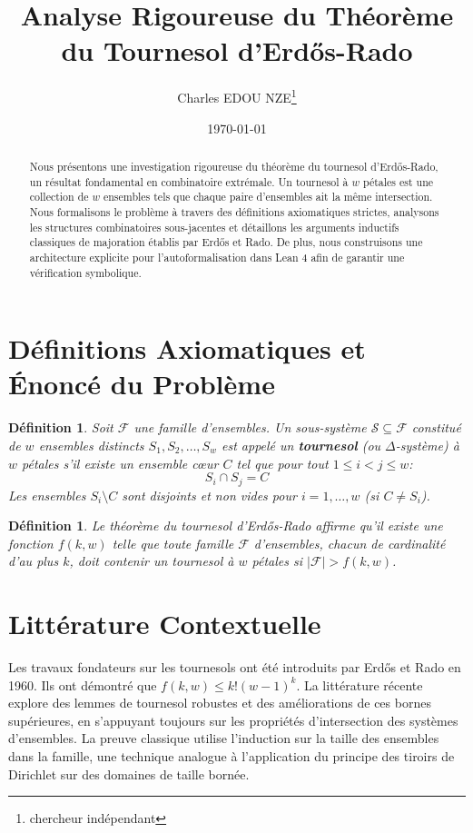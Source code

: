 \documentclass[12pt,a4paper]{article}
\title{Analyse Rigoureuse du Th\'eor\`eme du Tournesol d'Erd\H{o}s-Rado}
\author{Charles EDOU NZE\thanks{chercheur ind\'ependant}}
\date{\today}
\newtheorem{definition}[theorem]{D\'efinition}
\begin{document}
\maketitle
\thispagestyle{fancy}
\fancyhf{}
\renewcommand{\headrulewidth}{0pt}

\begin{abstract}
Nous pr\'esentons une investigation rigoureuse du th\'eor\`eme du tournesol d'Erd\H{o}s-Rado, un r\'esultat fondamental en combinatoire extr\'emale. Un tournesol \`a $w$ p\'etales est une collection de $w$ ensembles tels que chaque paire d'ensembles ait la m\^eme intersection. Nous formalisons le probl\`eme \`a travers des d\'efinitions axiomatiques strictes, analysons les structures combinatoires sous-jacentes et d\'etaillons les arguments inductifs classiques de majoration \'etablis par Erd\H{o}s et Rado. De plus, nous construisons une architecture explicite pour l'autoformalisation dans Lean 4 afin de garantir une v\'erification symbolique.
\end{abstract}

\section{D\'efinitions Axiomatiques et \'Enonc\'e du Probl\`eme}
\begin{definition}
Soit $\mathcal{F}$ une famille d'ensembles. Un sous-syst\`eme $\mathcal{S} \subseteq \mathcal{F}$ constitu\'e de $w$ ensembles distincts $S_1, S_2, \dots, S_w$ est appel\'e un \textbf{tournesol} (ou $\Delta$-syst\`eme) \`a $w$ p\'etales s'il existe un ensemble c{\oe}ur $C$ tel que pour tout $1 \le i < j \le w$:
\begin{equation}
S_i \cap S_j = C \label{eq:sunflower}
\end{equation}
Les ensembles $S_i \setminus C$ sont disjoints et non vides pour $i = 1, \dots, w$ (si $C \neq S_i$).
\end{definition}
\begin{definition}
Le th\'eor\`eme du tournesol d'Erd\H{o}s-Rado affirme qu'il existe une fonction $f(k, w)$ telle que toute famille $\mathcal{F}$ d'ensembles, chacun de cardinalit\'e d'au plus $k$, doit contenir un tournesol \`a $w$ p\'etales si $|\mathcal{F}| > f(k, w)$.
\end{definition}

\section{Litt\'erature Contextuelle}
Les travaux fondateurs sur les tournesols ont \'et\'e introduits par Erd\H{o}s et Rado en 1960. Ils ont d\'emontr\'e que $f(k, w) \le k!(w-1)^k$. La litt\'erature r\'ecente explore des lemmes de tournesol robustes et des am\'eliorations de ces bornes sup\'erieures, en s'appuyant toujours sur les propri\'et\'es d'intersection des syst\`emes d'ensembles. La preuve classique utilise l'induction sur la taille des ensembles dans la famille, une technique analogue \`a l'application du principe des tiroirs de Dirichlet sur des domaines de taille born\'ee.
\end{document}
